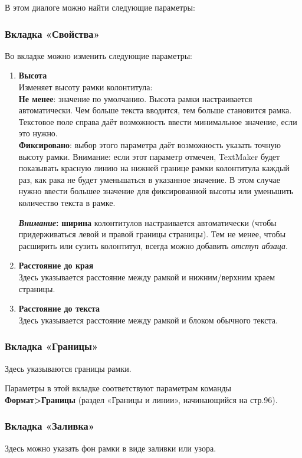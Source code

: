 \documentclass[a4paper,10pt]{article}
\begin{document}
В этом диалоге можно найти следующие параметры:

\subsubsection{Вкладка «Свойства»}
Во вкладке можно изменить следующие  параметры:
\begin{enumerate}
 \item \textbf{Высота}\\
 Изменяет высоту рамки колонтитула:\\
 \textbf{Не менее}: значение по умолчанию. Высота рамки настраивается автоматически. Чем больше текста вводится, тем больше становится рамка. Текстовое поле справа даёт возможность ввести минимальное значение, если это нужно.\\
 \textbf{Фиксировано}: выбор этого параметра даёт возможность указать точную высоту рамки. Внимание: если этот параметр отмечен, TextMaker будет показывать красную линию на нижней границе рамки колонтитула каждый раз, как рака не будет уменьшаться в указанное значение. В этом случае нужно ввести большее значение для фиксированной высоты или уменьшить количество текста в рамке.
 \begin{mdframed}[backgroundcolor=blue!10]
\textbf{\textit{Внимание}:} \textbf{ширина} колонтитулов настраивается автоматически (чтобы придерживаться левой и правой границы страницы). Тем не менее, чтобы расширить или сузить колонтитул, всегда можно добавить \textit{отступ абзаца}. 
\end{mdframed}
\item \textbf{Расстояние до края}\\
Здесь указывается расстояние между рамкой и нижним/верхним краем страницы.
\item \textbf{Расстояние до текста}\\
Здесь указывается расстояние между рамкой и блоком обычного текста.
\end{enumerate}

\subsubsection{Вкладка «Границы»}
Здесь указываются границы рамки.

Параметры в этой вкладке соответствуют параметрам команды \textbf{Формат>Границы} (раздел «Границы и линии», начинающийся на стр.96).

\subsubsection{Вкладка «Заливка»}
Здесь можно указать фон рамки в виде заливки или узора.
\end{document}
